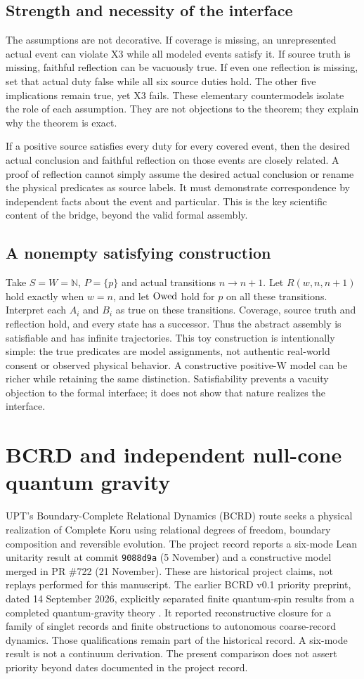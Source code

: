 \documentclass[11pt,a4paper]{article}
\begin{document}
\subsection{Strength and necessity of the interface}
The assumptions are not decorative. If coverage is missing, an unrepresented actual event can violate X3 while all modeled events satisfy it. If source truth is missing, faithful reflection can be vacuously true. If even one reflection is missing, set that actual duty false while all six source duties hold. The other five implications remain true, yet X3 fails. These elementary countermodels isolate the role of each assumption. They are not objections to the theorem; they explain why the theorem is exact.

If a positive source satisfies every duty for every covered event, then the desired actual conclusion and faithful reflection on those events are closely related. A proof of reflection cannot simply assume the desired actual conclusion or rename the physical predicates as source labels. It must demonstrate correspondence by independent facts about the event and particular. This is the key scientific content of the bridge, beyond the valid formal assembly.
\subsection{A nonempty satisfying construction}
Take $S=W=\mathbb N$, $P=\{p\}$ and actual transitions $n\to n+1$. Let $R(w,n,n+1)$ hold exactly when $w=n$, and let $\mathrm{Owed}$ hold for $p$ on all these transitions. Interpret each $A_i$ and $B_i$ as true on these transitions. Coverage, source truth and reflection hold, and every state has a successor. Thus the abstract assembly is satisfiable and has infinite trajectories. This toy construction is intentionally simple: the true predicates are model assignments, not authentic real-world consent or observed physical behavior. A constructive positive-W model can be richer while retaining the same distinction. Satisfiability prevents a vacuity objection to the formal interface; it does not show that nature realizes the interface.
\section{BCRD and independent null-cone quantum gravity}
UPT's Boundary-Complete Relational Dynamics (BCRD) route seeks a physical realization of Complete Koru using relational degrees of freedom, boundary composition and reversible evolution. The project record reports a six-mode Lean unitarity result at commit \texttt{9088d9a} (5 November) and a constructive model merged in PR \#722 (21 November). These are historical project claims, not replays performed for this manuscript. The earlier BCRD v0.1 priority preprint, dated 14 September 2026, explicitly separated finite quantum-spin results from a completed quantum-gravity theory \cite{bcrd}. It reported reconstructive closure for a family of singlet records and finite obstructions to autonomous coarse-record dynamics. Those qualifications remain part of the historical record. A six-mode result is not a continuum derivation. The present comparison does not assert priority beyond dates documented in the project record.
\end{document}
